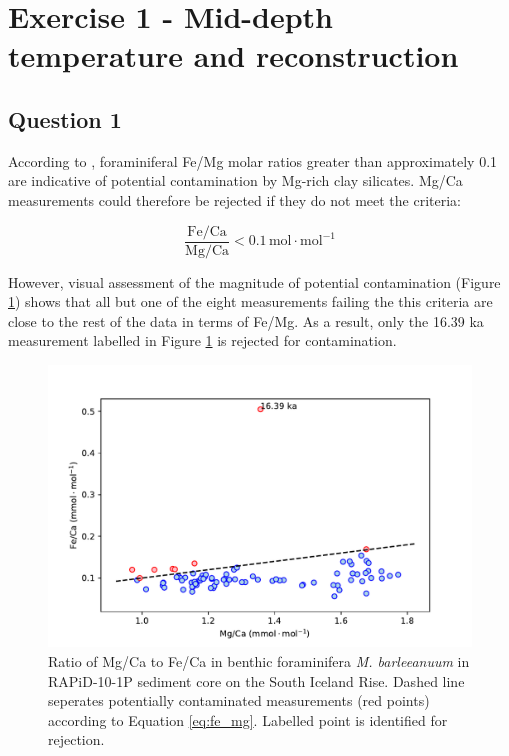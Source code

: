 \section{Exercise 1 - Mid-depth temperature and  reconstruction}

\subsection{Question 1}
\label{sec:Q1}
According to \citeauthor{barker2003study} \parencite{barker2003study}, foraminiferal Fe/Mg molar ratios greater than approximately 0.1 are indicative of potential contamination by Mg-rich clay silicates.
Mg/Ca measurements could therefore be rejected if they do not meet the criteria:

\begin{equation} \label{eq:fe_mg}
    \frac{\mathrm{Fe}/\mathrm{Ca}}{\mathrm{Mg}/\mathrm{Ca}} < 0.1 \, \mathrm{mol \cdot mol^{-1}}
\end{equation}

However, visual assessment of the magnitude of potential contamination (Figure \ref{fig:Mg_Fe}) shows that all but one of the eight measurements failing the this criteria are close to the rest of the data in terms of Fe/Mg.
As a result, only the 16.39 ka measurement labelled in Figure \ref{fig:Mg_Fe} is rejected for contamination.

\begin{figure}[h]
\includegraphics[width=\textwidth]{img/scatter_MgCa_x_FeCa_contaminated.pdf}
    \caption{Ratio of Mg/Ca to Fe/Ca in benthic foraminifera \emph{M. barleeanuum} in RAPiD-10-1P sediment core on the South Iceland Rise.
             Dashed line seperates potentially contaminated measurements (red points) according to Equation \ref{eq:fe_mg}.
             Labelled point is identified for rejection.}
        \label{fig:Mg_Fe}
\end{figure}

